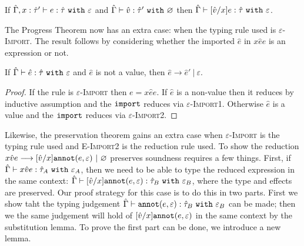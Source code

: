 \begin{lemma}[Substitution]
If $\hat \Gamma, x: \hat \tau' \vdash e: \hat \tau~\mathtt{with}~ \varepsilon$ and $\hat \Gamma \vdash \hat v: \hat \tau'~\mathtt{with}~ \varnothing$ then $\hat \Gamma \vdash [\hat v/x]e: \hat \tau~\mathtt{with}~ \varepsilon$.
\end{lemma}

The Progress Theorem now has an extra case: when the typing rule used is \textsc{$\varepsilon$-Import}. The result follows by considering whether the imported $\hat e$ in ${x}{\hat e}{e}$ is an expression or not.

\begin{theorem}[Progress]
If $\hat \Gamma \vdash \hat e: \hat \tau~\mathtt{with}~ \varepsilon$ and $\hat e$ is not a value, then $\hat e \longrightarrow \hat e'~|~\varepsilon$.
\end{theorem}

\begin{proof} If the rule is \textsc{$\varepsilon$-Import} then $e = {x}{\hat e}{e}$. If $\hat e$ is a non-value then it reduces by inductive assumption and the $\mathtt{import}$ reduces via \textsc{$\varepsilon$-Import1}. Otherwise $\hat e$ is a value and the $\mathtt{import}$ reduces via \textsc{$\varepsilon$-Import2}.
\end{proof}

Likewise, the preservation theorem gains an extra case when \textsc{$\varepsilon$-Import} is the typing rule used and \textsc{E-Import2} is the reduction rule used. To show the reduction ${x}{\hat v}{e} \longrightarrow [\hat v/x]\mathtt{annot}(e, \varepsilon)~|~\varnothing$ preserves soundness requires a few things. First, if $\hat \Gamma \vdash {x}{\hat v}{e}: \hat \tau_A~\mathtt{with}~ \varepsilon_A$, then we need to be able to type the reduced expression in the same context: $\hat \Gamma \vdash [\hat v/x]\mathtt{annot}(e, \varepsilon): \hat \tau_B~\mathtt{with}~ \varepsilon_B$, where the type and effects are preserved. Our proof strategy for this case is to do this in two parts. First we show taht the typing judgement $\hat \Gamma \vdash \mathtt{annot}(e, \varepsilon): \hat \tau_B~\mathtt{with}~ \varepsilon_B$ can be made; then we the same judgement will hold of $[\hat v/x]\mathtt{annot}(e, \varepsilon)$ in the same context by the substitution lemma. To prove the first part can be done, we introduce a new lemma.

